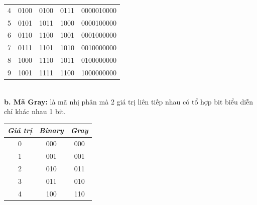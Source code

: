 \begin{table}[h!]
\begin{tabular}{|c|c|c|c|c|}
    4                                                               & 0100                                                             & 0100                                                             & 0111                                                         & 0000010000             \\ 
    5                                                               & 0101                                                             & 1011                                                             & 1000                                                         & 0000100000             \\ 
    6                                                               & 0110                                                             & 1100                                                             & 1001                                                         & 0001000000             \\ 
    7                                                               & 0111                                                             & 1101                                                             & 1010                                                         & 0010000000             \\ 
    8                                                               & 1000                                                             & 1110                                                             & 1011                                                         & 0100000000             \\ 
    9                                                               & 1001                                                             & 1111                                                             & 1100                                                         & 1000000000             \\ \hline
    \end{tabular}
\end{table}\\
\textbf{b. Mã Gray:} là mã nhị phân mà 2 giá trị liên tiếp nhau có tổ hợp bit biểu diễn chỉ khác nhau 1 bit.
\begin{table}[h!]
    \centering
    \begin{tabular}{|c|c|c|}
    \hline
    \textit{\textbf{Giá trị}} & \textit{\textbf{Binary}} & \textit{\textbf{Gray}} \\ \hline
    0                         & 000                      & 000                    \\ 
    1                         & 001                      & 001                    \\ 
    2                         & 010                      & 011                    \\ 
    3                         & 011                      & 010                    \\ 
    4                         & 100                      & 110                    \\ \hline
    \end{tabular}
\end{table}

